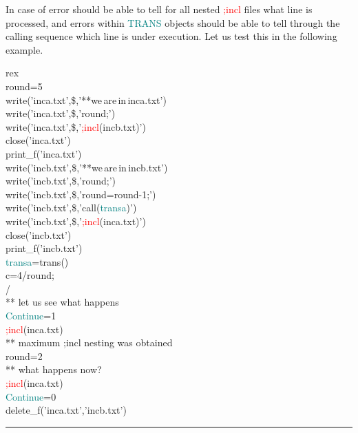 In case of error should be able to tell for all nested \textcolor{Red}{;incl} files what line is 
processed, and errors within \textcolor{teal}{TRANS} objects should be able to tell through the calling sequence 
which line is under execution. 
Let us test this in the following example. 
 
\singlespacing 
\begin{example}[errorex]rex\\ 
\label{errorex} 
\noindent round=5\\ 
\textcolor{VioletRed}{write}('inca.txt',\$,'**we\,are\,in\,inca.txt')\\ 
\textcolor{VioletRed}{write}('inca.txt',\$,'round;')\\ 
\textcolor{VioletRed}{write}('inca.txt',\$,'\textcolor{Red}{;incl}(incb.txt)')\\ 
\textcolor{VioletRed}{close}('inca.txt')\\ 
\textcolor{VioletRed}{print\_f}('inca.txt')\\ 
\textcolor{VioletRed}{write}('incb.txt',\$,'**we\,are\,in\,incb.txt')\\ 
\textcolor{VioletRed}{write}('incb.txt',\$,'round;')\\ 
\textcolor{VioletRed}{write}('incb.txt',\$,'round=round-1;')\\ 
\textcolor{VioletRed}{write}('incb.txt',\$,'\textcolor{VioletRed}{call}(\textcolor{teal}{transa})')\\ 
\textcolor{VioletRed}{write}('incb.txt',\$,'\textcolor{Red}{;incl}(inca.txt)')\\ 
\textcolor{VioletRed}{close}('incb.txt')\\ 
\textcolor{VioletRed}{print\_f}('incb.txt')\\ 
\textcolor{teal}{transa}=\textcolor{VioletRed}{trans}()\\ 
c=4/round;\\ 
/         \\ 
{\color{ForestGreen}** let us see what happens}\\ 
\textcolor{teal}{Continue}=1\\ 
\textcolor{Red}{;incl}(inca.txt)\\ 
{\color{ForestGreen}** maximum ;incl nesting was obtained}\\ 
 
round=2\\ 
{\color{ForestGreen}** what happens now?}\\ 
\textcolor{Red}{;incl}(inca.txt)\\ 
\textcolor{teal}{Continue}=0\\ 
\textcolor{VioletRed}{delete\_f}('inca.txt','incb.txt')\\ 
\end{example} 
\vspace{-7mm} \rule{5cm}{0.1pt} 
\onehalfspacing 
